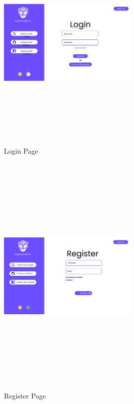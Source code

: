 \begin{figure}[H]
    \centering
\includegraphics[height=10cm, width=0.6\textwidth]{./images/prototype/0001}
 \caption{Login Page}
\label{fig:prototype1} 

\includegraphics[height=12cm, width=0.6\textwidth]{./images/prototype/Group 45}
\centering 
\caption{Register Page}
\label{fig:prototype1}
\end{figure}

